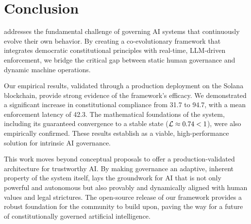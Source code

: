 \section{Conclusion}\label{sec:conclusion}
\acgs{} addresses the fundamental challenge of governing AI systems that continuously evolve their own behavior. By creating a co-evolutionary framework that integrates democratic constitutional principles with real-time, LLM-driven enforcement, we bridge the critical gap between static human governance and dynamic machine operations.

Our empirical results, validated through a production deployment on the Solana blockchain, provide strong evidence of the framework's efficacy. We demonstrated a significant increase in constitutional compliance from 31.7\percent{} to 94.7\percent{}, with a mean enforcement latency of 42.3\ms{}. The mathematical foundations of the system, including its guaranteed convergence to a stable state ($\lipschitz \approx 0.74 < 1$), were also empirically confirmed. These results establish \acgs{} as a viable, high-performance solution for intrinsic AI governance.

This work moves beyond conceptual proposals to offer a production-validated architecture for trustworthy AI\@. By making governance an adaptive, inherent property of the system itself, \acgs{} lays the groundwork for AI that is not only powerful and autonomous but also provably and dynamically aligned with human values and legal strictures. The open-source release of our framework provides a robust foundation for the community to build upon, paving the way for a future of constitutionally governed artificial intelligence.
